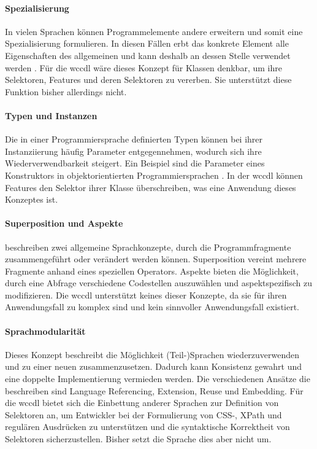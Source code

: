     \paragraph*{Spezialisierung}
    In vielen Sprachen können Programmelemente andere erweitern und somit eine Spezialisierung formulieren.
    In diesen Fällen erbt das konkrete Element alle Eigenschaften des allgemeinen
    und kann deshalb an dessen Stelle verwendet werden
    \cite[Kapitel 5.1.4]{voelter:DslEngineering}.
    Für die \gls{wccdl} wäre dieses Konzept für Klassen denkbar,
    um ihre Selektoren, Features und deren Selektoren zu vererben.
    Sie unterstützt diese Funktion bisher allerdings nicht.

    \paragraph*{Typen und Instanzen}
    Die in einer Programmiersprache definierten Typen können bei ihrer Instanziierung
    häufig Parameter entgegennehmen, wodurch sich ihre Wiederverwendbarkeit steigert.
    Ein Beispiel sind die Parameter eines Konstruktors in objektorientierten Programmiersprachen
    \cite[Kapitel 5.1.5]{voelter:DslEngineering}.
    In der \gls{wccdl} können Features den Selektor ihrer Klasse überschreiben,
    was eine Anwendung dieses Konzeptes ist.

    \paragraph*{Superposition und Aspekte}
    \citet[Kapitel 5.1.6]{voelter:DslEngineering} beschreiben zwei
    allgemeine Sprachkonzepte, durch die Programmfragmente zusammengeführt
    oder verändert werden können.
    Superposition vereint mehrere Fragmente anhand eines speziellen Operators.
    Aspekte bieten die Möglichkeit, durch eine Abfrage verschiedene Codestellen
    auszuwählen und aspektspezifisch zu modifizieren.
    Die \gls{wccdl} unterstützt keines dieser Konzepte,
    da sie für ihren Anwendungsfall zu komplex sind und kein sinnvoller Anwendungsfall existiert.

    \paragraph*{Sprachmodularität}
    Dieses Konzept beschreibt die Möglichkeit (Teil-)Sprachen wiederzuverwenden
    und zu einer neuen zusammenzusetzen.
    Dadurch kann Konsistenz gewahrt und eine doppelte Implementierung vermieden werden.
    Die verschiedenen Ansätze die \citet[Kapitel 4.6]{voelter:DslEngineering} beschreiben
    sind Language Referencing, Extension, Reuse und Embedding.
    Für die \gls{wccdl} bietet sich die Einbettung anderer Sprachen zur Definition von Selektoren an,
    um Entwickler bei der Formulierung von CSS-, XPath und regulären Ausdrücken zu unterstützen
    und die syntaktische Korrektheit von Selektoren sicherzustellen.
    Bisher setzt die Sprache dies aber nicht um.
